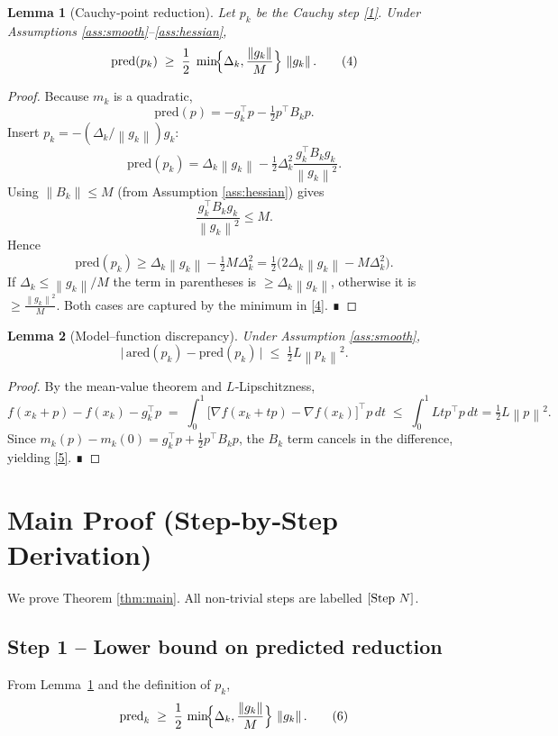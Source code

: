 \documentclass{article}
\newtheorem{lemma}{Lemma}
\newcommand{\norm}[1]{\left\lVert#1\right\rVert}
\begin{document}
\begin{lemma}[Cauchy‑point reduction]\label{lem:cauchy}
Let $p_{k}$ be the Cauchy step \eqref{1}. Under Assumptions \ref{ass:smooth}–\ref{ass:hessian},
\[
\text{pred}(p_{k})\;\ge\;
\frac12\;\min\!\Bigl\{\Delta_{k},\frac{\norm{g_{k}}}{M}\Bigr\}\,\norm{g_{k}} .
\tag{4}
\]
\end{lemma}
\begin{proof}
Because $m_{k}$ is a quadratic,
\[
\text{pred}(p)= -g_{k}^{\top}p-\tfrac12 p^{\top}B_{k}p .
\]
Insert $p_{k}=-(\Delta_{k}/\norm{g_{k}})g_{k}$:
\[
\text{pred}(p_{k})=
\Delta_{k}\norm{g_{k}}-\tfrac12\Delta_{k}^{2}
\frac{g_{k}^{\top}B_{k}g_{k}}{\norm{g_{k}}^{2}} .
\]
Using $\norm{B_{k}}\le M$ (from Assumption \ref{ass:hessian}) gives
\[
\frac{g_{k}^{\top}B_{k}g_{k}}{\norm{g_{k}}^{2}}\le M .
\]
Hence
\[
\text{pred}(p_{k})\ge \Delta_{k}\norm{g_{k}}-\tfrac12 M\Delta_{k}^{2}
= \tfrac12\bigl(2\Delta_{k}\norm{g_{k}}-M\Delta_{k}^{2}\bigr).
\]
If $\Delta_{k}\le \norm{g_{k}}/M$ the term in parentheses is $\ge \Delta_{k}\norm{g_{k}}$, otherwise it is $\ge \frac{\norm{g_{k}}^{2}}{M}$. Both cases are captured by the minimum in \eqref{4}. ∎
\end{proof}

\begin{lemma}[Model–function discrepancy]\label{lem:discrep}
Under Assumption \ref{ass:smooth},
\[
\bigl|\,\text{ared}(p_{k})-\text{pred}(p_{k})\,\bigr|
\;\le\;\tfrac12 L \norm{p_{k}}^{2}.
\tag{5}
\]
\end{lemma}
\begin{proof}
By the mean‑value theorem and $L$‑Lipschitzness,
\[
f(x_{k}+p)-f(x_{k})-g_{k}^{\top}p
\;=\;\int_{0}^{1}\!\bigl[\nabla f(x_{k}+tp)-\nabla f(x_{k})\bigr]^{\!\top}p\,dt
\;\le\;\int_{0}^{1} Ltp^{\top}p\,dt
=\tfrac12 L\norm{p}^{2}.
\]
Since $m_{k}(p)-m_{k}(0)=g_{k}^{\top}p+\tfrac12 p^{\top}B_{k}p$, the $B_{k}$ term cancels in the difference, yielding \eqref{5}. ∎
\end{proof}

\section*{Main Proof (Step‑by‑Step Derivation)}
We prove Theorem \ref{thm:main}.  
All non‑trivial steps are labelled \([{\rm Step}\ N]\).

\subsection*{Step 1 – Lower bound on predicted reduction}
From Lemma~\ref{lem:cauchy} and the definition of $p_{k}$,
\[
\text{pred}_{k}\;\ge\;
\frac12\,\min\!\Bigl\{\Delta_{k},\frac{\norm{g_{k}}}{M}\Bigr\}\,\norm{g_{k}} .
\tag{6}
\]
\end{document}
